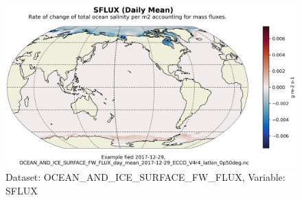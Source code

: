 \begin{figure}[H]
\centering
\includegraphics[scale=0.55]{../images/plots/latlon_plots/Ocean_and_Sea-Ice_Surface_Freshwater_Fluxes/SFLUX.png}
\caption{Dataset: OCEAN\_AND\_ICE\_SURFACE\_FW\_FLUX, Variable: SFLUX}
\label{tab:table-OCEAN_AND_ICE_SURFACE_FW_FLUX_SFLUX-Plot}
\end{figure}
\pagebreak
